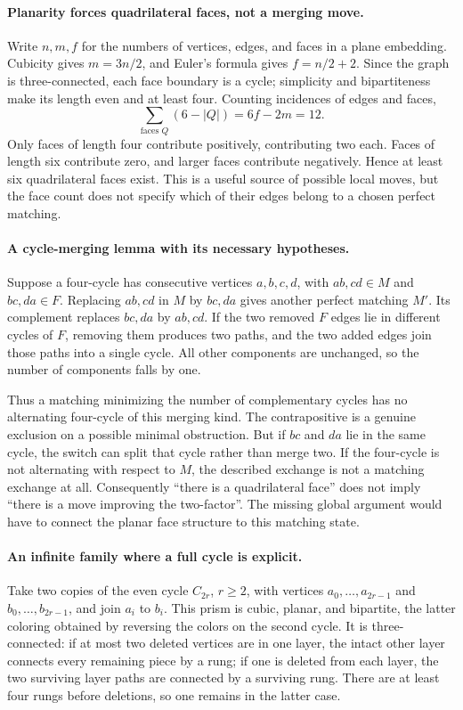 \documentclass[11pt,a4paper]{article}
\begin{document}
\paragraph{Planarity forces quadrilateral faces, not a merging move.}
Write $n,m,f$ for the numbers of vertices, edges, and faces in a plane
embedding. Cubicity gives $m=3n/2$, and Euler's formula gives
$f=n/2+2$. Since the graph is three-connected, each face boundary is
a cycle; simplicity and bipartiteness make its length even and at
least four. Counting incidences of edges and faces,
\[
       \sum_{\text{faces }Q}(6-|Q|)=6f-2m=12.
\]
Only faces of length four contribute positively, contributing two
each. Faces of length six contribute zero, and larger faces contribute
negatively. Hence at least six quadrilateral faces exist. This is a
useful source of possible local moves, but the face count does not
specify which of their edges belong to a chosen perfect matching.

\paragraph{A cycle-merging lemma with its necessary hypotheses.}
Suppose a four-cycle has consecutive vertices $a,b,c,d$, with
$ab,cd\in M$ and $bc,da\in F$. Replacing $ab,cd$ in $M$ by
$bc,da$ gives another perfect matching $M'$. Its complement replaces
$bc,da$ by $ab,cd$. If the two removed $F$ edges lie in different
cycles of $F$, removing them produces two paths, and the two added
edges join those paths into a single cycle. All other components are
unchanged, so the number of components falls by one.

Thus a matching minimizing the number of complementary cycles has
no alternating four-cycle of this merging kind. The contrapositive is
a genuine exclusion on a possible minimal obstruction. But if $bc$
and $da$ lie in the same cycle, the switch can split that cycle rather
than merge two. If the four-cycle is not alternating with respect to
$M$, the described exchange is not a matching exchange at all.
Consequently ``there is a quadrilateral face'' does not imply ``there
is a move improving the two-factor''. The missing global argument
would have to connect the planar face structure to this matching state.

\paragraph{An infinite family where a full cycle is explicit.}
Take two copies of the even cycle $C_{2r}$, $r\ge2$, with vertices
$a_0,\ldots,a_{2r-1}$ and $b_0,\ldots,b_{2r-1}$, and join $a_i$
to $b_i$. This prism is cubic, planar, and bipartite, the latter
coloring obtained by reversing the colors on the second cycle. It is
three-connected: if at most two deleted vertices are in one layer,
the intact other layer connects every remaining piece by a rung; if
one is deleted from each layer, the two surviving layer paths are
connected by a surviving rung. There are at least four rungs before
deletions, so one remains in the latter case.
\end{document}

